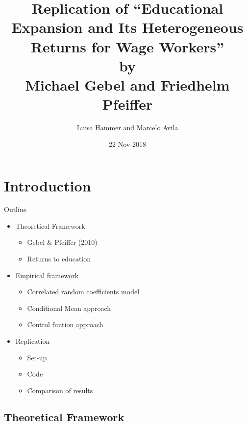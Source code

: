 \documentclass[10pt,ignorenonframetext,]{beamer}
\title{Replication of ``Educational Expansion and Its Heterogeneous Returns for
Wage Workers''\\
by\\
Michael Gebel and Friedhelm Pfeiffer}
\author{Luisa Hammer and Marcelo Avila}
\date{22 Nov 2018}
\providecommand{\tightlist}{%
  \setlength{\itemsep}{0pt}\setlength{\parskip}{0pt}}
\begin{document}
\frame{\titlepage}

\hypertarget{introduction}{%
\section{Introduction}\label{introduction}}

\begin{frame}{Outline}
\protect\hypertarget{outline}{}

\begin{itemize}
\item
  Theoretical Framework

  \begin{itemize}
  \tightlist
  \item
    Gebel \& Pfeiffer (2010)
  \item
    Returns to education
  \end{itemize}
\item
  Empirical framework

  \begin{itemize}
  \tightlist
  \item
    Correlated random coefficients model
  \item
    Conditional Mean approach
  \item
    Control funtion approach
  \end{itemize}
\item
  Replication

  \begin{itemize}
  \tightlist
  \item
    Set-up
  \item
    Code
  \item
    Comparison of results
  \end{itemize}
\end{itemize}

\end{frame}

\hypertarget{theoretical-framework}{%
\subsection{Theoretical Framework}\label{theoretical-framework}}
\end{document}
